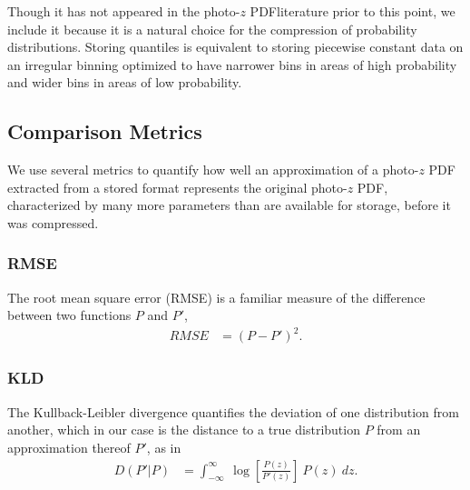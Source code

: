 \documentclass[\docopts]{\docclass}
\newcommand{\pz}{photo-$z$ PDF}
\begin{document}
Though it has not appeared in the \pz  literature prior to this point, we 
include it because it is a natural choice for the compression of probability 
distributions.  Storing quantiles is equivalent to storing piecewise constant 
data on an irregular binning optimized to have narrower bins in areas of high 
probability and wider bins in areas of low probability.

\subsection{Comparison Metrics}
\label{sec:metrics}


We use several metrics to quantify how well an approximation of a \pz  
extracted from a stored format represents the original \pz , characterized by 
many more parameters than are available for storage, before it was compressed.



\subsubsection{RMSE}
\label{sec:rms}

The root mean square error (RMSE) is a familiar measure of the difference 
between two functions $P$ and $P'$,
\begin{align}
  \label{eq:rmse}
  RMSE &= (P - P')^{2}.
\end{align}

\subsubsection{KLD}
\label{sec:kld}

The Kullback-Leibler divergence quantifies the deviation of one distribution 
from another, which in our case is the distance to a true distribution $P$ from 
an approximation thereof $P'$, as in
\begin{align}
  \label{eq:kld}
  D(P' | P) &= \int_{-\infty}^{\infty}\ \log\left[\frac{P(z)}{P'(z)}\right]\ 
P(z)\ dz.
\end{align}
\end{document}
